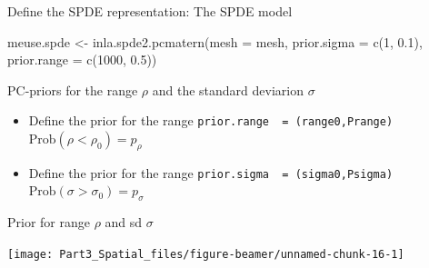 \documentclass[
  ignorenonframetext,
]{beamer}
\newenvironment{Shaded}{\begin{snugshade}}{\end{snugshade}}
\newcommand{\AttributeTok}[1]{\textcolor[rgb]{0.77,0.63,0.00}{#1}}
\newcommand{\DecValTok}[1]{\textcolor[rgb]{0.00,0.00,0.81}{#1}}
\newcommand{\FloatTok}[1]{\textcolor[rgb]{0.00,0.00,0.81}{#1}}
\newcommand{\FunctionTok}[1]{\textcolor[rgb]{0.00,0.00,0.00}{#1}}
\newcommand{\NormalTok}[1]{#1}
\newcommand{\OtherTok}[1]{\textcolor[rgb]{0.56,0.35,0.01}{#1}}
\begin{document}
\begin{frame}[fragile]{Define the SPDE representation: The SPDE model}
\protect\hypertarget{define-the-spde-representation-the-spde-model}{}
\small

\begin{Shaded}
\begin{Highlighting}[]
\NormalTok{meuse.spde }\OtherTok{\textless{}{-}} \FunctionTok{inla.spde2.pcmatern}\NormalTok{(}\AttributeTok{mesh =}\NormalTok{ mesh,}
                                  \AttributeTok{prior.sigma =} \FunctionTok{c}\NormalTok{(}\DecValTok{1}\NormalTok{, }\FloatTok{0.1}\NormalTok{),}
                                  \AttributeTok{prior.range =} \FunctionTok{c}\NormalTok{(}\DecValTok{1000}\NormalTok{, }\FloatTok{0.5}\NormalTok{))}
\end{Highlighting}
\end{Shaded}

\normalsize

PC-priors for the range \(\rho\) and the standard deviarion \(\sigma\)

\begin{itemize}
\item
  Define the prior for the range
  \texttt{prior.range\ \ =\ (range0,Prange)}
  \(\text{Prob}(\rho<\rho_0) = p_{\rho}\)
\item
  Define the prior for the range
  \texttt{prior.sigma\ \ =\ (sigma0,Psigma)}
  \(\text{Prob}(\sigma>\sigma_0) = p_{\sigma}\)
\end{itemize}
\end{frame}

\begin{frame}{Prior for range \(\rho\) and sd \(\sigma\)}
\protect\hypertarget{prior-for-range-rho-and-sd-sigma}{}
\begin{center}\texttt{[image: Part3\_Spatial\_files/figure-beamer/unnamed-chunk-16-1]} \end{center}
\end{frame}
\end{document}
